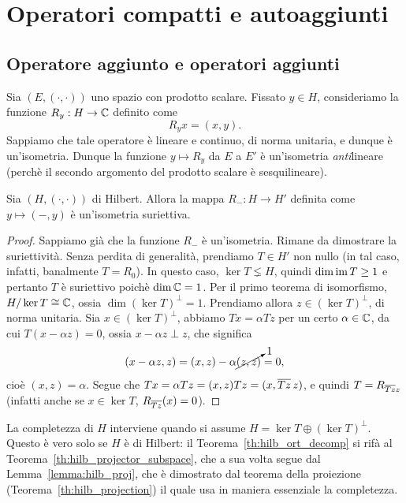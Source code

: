 \chapter{Operatori compatti e autoaggiunti}

\section{Operatore aggiunto e operatori aggiunti}
Sia $(E, (\cdot, \cdot))$ uno spazio con prodotto scalare.
Fissato $y \in H$, consideriamo la funzione $R_y : H \to \mathbb{C}$ definito come
\begin{equation*}
	R_y x = (x,y).
\end{equation*}
Sappiamo che tale operatore è lineare e continuo, di norma unitaria, e dunque è un'isometria. Dunque la funzione $y \mapsto R_y$ da $E$ a $E'$ è un'isometria \emph{anti}lineare (perchè il secondo argomento del prodotto scalare è sesquilineare).

\begin{theorem}
\label{eq:ops_riesz}
	Sia $(H, (\cdot,\cdot))$ di Hilbert.
	Allora la mappa $R_-: H \to H'$ definita come $y \mapsto (-, y)$ è un'isometria suriettiva.
\end{theorem}
\begin{proof}
	Sappiamo già che la funzione $R_-$ è un'isometria. Rimane da dimostrare la suriettività.
	Senza perdita di generalità, prendiamo $T \in H'$ non nullo (in tal caso, infatti, banalmente $T=R_0$).
	In questo caso, $\ker T \lneq H$, quindi $\dim \operatorname{im} T \geq 1$ e pertanto $T$ è suriettivo poichè $\dim \mathbb{C} = 1$.
	Per il primo teorema di isomorfismo, $H/\ker T \overset{}{\cong} \mathbb{C}$, ossia $\dim(\ker T)^\perp = 1$.
	Prendiamo allora $z \in (\ker T)^\perp$, di norma unitaria.
	Sia $x \in (\ker T)^\perp$, abbiamo $Tx = \alpha Tz$ per un certo $\alpha \in \mathbb{C}$, da cui $T(x-\alpha z) = 0$, ossia $x-\alpha z \perp z$, che significa
	\begin{equation*}
		(x-\alpha z, z) = (x,z) - \alpha \cancelto{1}{(z,z)} = 0,
	\end{equation*}
	cioè $(x,z) = \alpha$. Segue che $Tx = \alpha Tz = (x,z)Tz = (x, \overline{Tz}\, z)$, e quindi $T = R_{\overline{Tz} z}$ (infatti anche se $x \in \ker T$, $R_{\overline{Tz} }(x) = 0$).
\end{proof}

\begin{remark}
	La completezza di $H$ interviene quando si assume ${H = \ker T \oplus (\ker T)^\perp}$. Questo è vero solo se $H$ è di Hilbert: il Teorema~\ref{th:hilb_ort_decomp} si rifà al Teorema~\ref{th:hilb_projector_subspace}, che a sua volta segue dal Lemma~\ref{lemma:hilb_proj}, che è dimostrato dal teorema della proiezione (Teorema~\ref{th:hilb_projection}) il quale usa in maniera essenziale la completezza.
\end{remark}

